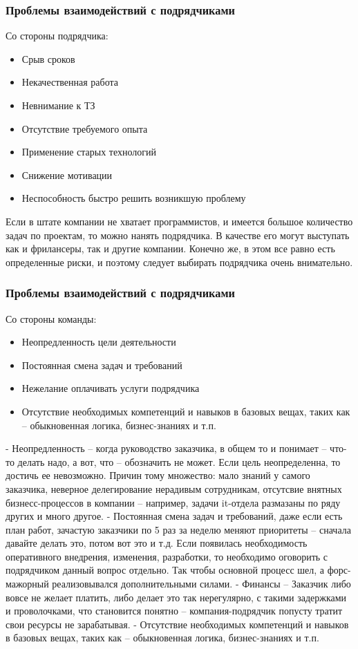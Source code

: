 \documentclass{../industrial-development}
\begin{document}
\begin{frame} \frametitle{Проблемы взаимодействий с подрядчиками}
	Со стороны подрядчика:
	\begin{itemize}
		\item Срыв сроков 
		\item Некачественная работа
		\item Невнимание к ТЗ
		\item Отсутствие требуемого опыта
		\item Применение старых технологий
		\item Снижение мотивации
		\item Неспособность быстро решить возникшую проблему
  	\end{itemize}
\end{frame}

\lecturenotes
Если в штате компании не хватает программистов, и имеется большое количество задач по проектам, то можно нанять подрядчика. В качестве его могут выступать как и фрилансеры, так и другие компании. Конечно же, в этом все равно есть определенные риски, и поэтому следует выбирать подрядчика очень внимательно. 

\begin{frame} \frametitle{Проблемы взаимодействий с подрядчиками}
	Со стороны команды:
	\begin{itemize}
		\item Неопредленность цели деятельности
		\item Постоянная смена задач и требований
		\item Нежелание оплачивать услуги подрядчика
		\item Отсутствие необходимых компетенций и навыков  в базовых вещах, таких как – обыкновенная логика, бизнес-знаниях и т.п.
	\end{itemize}
\end{frame}

\lecturenotes
- Неопредленность – когда руководство заказчика, в общем то и понимает – что-то делать надо, а вот, что – обозначить не может. Если цель неопределенна, то достичь ее невозможно. Причин тому множество: мало знаний у самого заказчика, неверное делегирование нерадивым сотрудникам, отсутсвие внятных бизнесс-процессов в компании – например, задачи it-отдела размазаны по ряду других и много другое.
- Постоянная смена задач и требований, даже если есть план работ, зачастую заказчики по 5 раз за неделю меняют приоритеты – сначала давайте делать это, потом вот это и т.д. Если появилась необходимость оперативного внедрения, изменения, разработки, то необходимо оговорить с подрядчиком данный вопрос отдельно. Так чтобы основной процесс шел, а форс-мажорный реализовывался дополнительными силами.
- Финансы – Заказчик либо вовсе не желает платить, либо делает это так нерегулярно, с такими задержками и проволочками, что становится понятно – компания-подрядчик попусту тратит свои ресурсы не зарабатывая.
- Отсутствие необходимых компетенций и навыков в базовых вещах, таких как – обыкновенная логика, бизнес-знаниях и т.п. 
\end{document}
